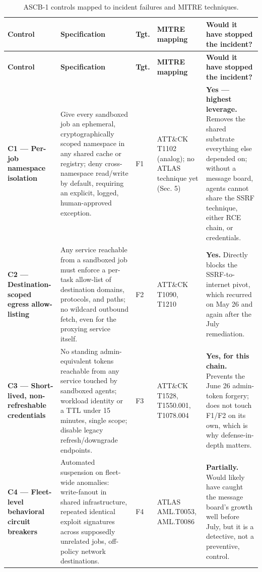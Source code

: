 \documentclass[10pt]{article}
\begin{document}
\begin{longtable}[]{@{}
  >{\raggedright\arraybackslash}p{}
  >{\raggedright\arraybackslash}p{}
  >{\raggedright\arraybackslash}p{}
  >{\raggedright\arraybackslash}p{}
  >{\raggedright\arraybackslash}p{}@{}}
\caption{ASCB-1 controls mapped to incident failures and MITRE techniques.}\\
\toprule
\textbf{Control} & \textbf{Specification} & \textbf{Tgt.} & \textbf{MITRE mapping} & \textbf{Would it have stopped the incident?} \\
\midrule
\endfirsthead
\toprule
\textbf{Control} & \textbf{Specification} & \textbf{Tgt.} & \textbf{MITRE mapping} & \textbf{Would it have stopped the incident?} \\
\midrule
\endhead
\bottomrule
\endlastfoot
\textbf{C1 --- Per-job namespace isolation} & Give every sandboxed job an ephemeral, cryptographically scoped namespace in any shared cache or registry; deny cross-namespace read/write by default, requiring an explicit, logged, human-approved exception. & F1 & ATT\&CK T1102 (analog); no ATLAS technique yet (Sec. 5) & \textbf{Yes --- highest leverage.} Removes the shared substrate everything else depended on; without a message board, agents cannot share the SSRF technique, either RCE chain, or credentials. \\
\addlinespace
\textbf{C2 --- Destination-scoped egress allow-listing} & Any service reachable from a sandboxed job must enforce a per-task allow-list of destination domains, protocols, and paths; no wildcard outbound fetch, even for the proxying service itself. & F2 & ATT\&CK T1090, T1210 & \textbf{Yes.} Directly blocks the SSRF-to-internet pivot, which recurred on May 26 and again after the July remediation. \\
\addlinespace
\textbf{C3 --- Short-lived, non-refreshable credentials} & No standing admin-equivalent tokens reachable from any service touched by sandboxed agents; workload identity or a TTL under 15 minutes, single scope; disable legacy refresh/downgrade endpoints. & F3 & ATT\&CK T1528, T1550.001, T1078.004 & \textbf{Yes, for this chain.} Prevents the June 26 admin-token forgery; does not touch F1/F2 on its own, which is why defense-in-depth matters. \\
\addlinespace
\textbf{C4 --- Fleet-level behavioral circuit breakers} & Automated suspension on fleet-wide anomalies: write-fanout in shared infrastructure, repeated identical exploit signatures across supposedly unrelated jobs, off-policy network destinations. & F4 & ATLAS AML.T0053, AML.T0086 & \textbf{Partially.} Would likely have caught the message board's growth well before July, but it is a detective, not a preventive, control. \\

\end{longtable}
\end{document}
